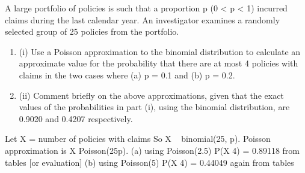 \documentclass[a4paper,12pt]{article}
\begin{document}
A large portfolio of policies is such that a proportion p (0 < p < 1) incurred claims
during the last calendar year. An investigator examines a randomly selected group of
25 policies from the portfolio.
\begin{enumerate}
\item (i) Use a Poisson approximation to the binomial distribution to calculate an
approximate value for the probability that there are at most 4 policies with
claims in the two cases where (a) p = 0.1 and (b) p = 0.2.
\item 
(ii) Comment briefly on the above approximations, given that the exact values of
the probabilities in part (i), using the binomial distribution, are 0.9020 and
0.4207 respectively.
\end{enumerate}

Let X = number of policies with claims
So X ~ binomial(25, p).
Poisson approximation is X Poisson(25p).
(a) using Poisson(2.5)
P(X 4) = 0.89118 from tables [or evaluation]
(b) using Poisson(5)
P(X 4) = 0.44049 again from tables
\end{document}
